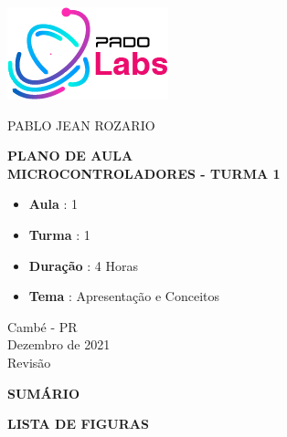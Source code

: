 \documentclass[12pt,a4paper]{report}
\begin{document}
%
%
\thispagestyle{empty}

\begin{center}
    \includegraphics[scale=0.7]{fig/logo.png}

    \vspace{.7cm}

    {\Large \uppercase{Pablo Jean Rozario}}

    \vspace{3cm}

    \Large \MakeUppercase{\textbf{PLANO DE AULA \\
            Microcontroladores - Turma 1 }}

    \vspace{3cm}

    \normalsize

    \begin{itemize}
        \item \textbf{Aula} : 1
        \item \textbf{Turma} : 1
        \item \textbf{Duração} : 4 Horas
        \item \textbf{Tema} : Apresentação e Conceitos
    \end{itemize}

    \vspace{3cm}

    Cambé - PR \\ Dezembro de 2021 \\ Revisão \Revisao
\end{center}

\newpage


\thispagestyle{empty}
\mbox{}
\newpage

%
%

\begingroup
\let\clearpage\relax
\newpage
\begin{center}
    \MakeUppercase{\bf Sumário}
\end{center}
\tableofcontents
\thispagestyle{empty}

\newpage
\begin{center}
    \MakeUppercase{\bf Lista de Figuras}
\end{center}
\listoffigures
\thispagestyle{empty}
\end{document}
